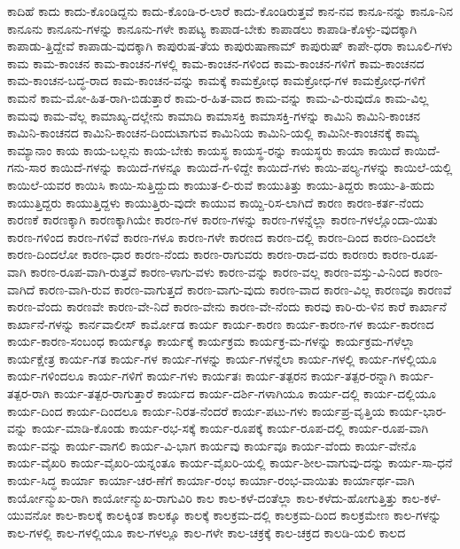 {ಕಾದಿಹೆ
ಕಾದು
ಕಾದು-ಕೊಂಡಿದ್ದನು
ಕಾದು-ಕೊಂಡಿ-ರ-ಲಾರೆ
ಕಾದು-ಕೊಂಡಿರುತ್ತವೆ
ಕಾನ-ನವ
ಕಾನೂ-ನನ್ನು
ಕಾನೂ-ನಿನ
ಕಾನೂನು
ಕಾನೂನು-ಗಳನ್ನು
ಕಾನೂನು-ಗಳೇ
ಕಾಪಟ್ಯ
ಕಾಪಾಡ-ಬೇಕು
ಕಾಪಾಡಲು
ಕಾಪಾಡಿ-ಕೊಳ್ಳು-ವುದಕ್ಕಾಗಿ
ಕಾಪಾಡು-ತ್ತಿದ್ದೇವೆ
ಕಾಪಾಡು-ವುದಕ್ಕಾಗಿ
ಕಾಪುರುಷ-ತೆಯ
ಕಾಪುರುಷಾಣಾಮ್
ಕಾಪುರುಷ್
ಕಾಪೇ-ಧರಾ
ಕಾಬೂಲಿ-ಗಳು
ಕಾಮ
ಕಾಮ-ಕಾಂಚನ
ಕಾಮ-ಕಾಂಚನ-ಗಳಲ್ಲಿ
ಕಾಮ-ಕಾಂಚನ-ಗಳಿಂದ
ಕಾಮ-ಕಾಂಚನ-ಗಳಿಗೆ
ಕಾಮ-ಕಾಂಚನದ
ಕಾಮ-ಕಾಂಚನ-ಬದ್ಧ-ರಾದ
ಕಾಮ-ಕಾಂಚನ-ವನ್ನು
ಕಾಮಕ್ಕೆ
ಕಾಮಕ್ರೋಧ
ಕಾಮಕ್ರೋಧ-ಗಳ
ಕಾಮಕ್ರೋಧ-ಗಳಿಗೆ
ಕಾಮನೆ
ಕಾಮ-ಮೋ-ಹಿತ-ರಾಗಿ-ಬಿಡುತ್ತಾರೆ
ಕಾಮ-ರ-ಹಿತ-ವಾದ
ಕಾಮ-ವನ್ನು
ಕಾಮ-ವಿ-ರುವುದೊ
ಕಾಮ-ವಿಲ್ಲ
ಕಾಮವು
ಕಾಮ-ವೆಲ್ಲ
ಕಾಮಾಖ್ಯ-ದಲ್ಲೇನು
ಕಾಮಾದಿ
ಕಾಮಾಸಕ್ತಿ
ಕಾಮಾಸಕ್ತಿ-ಗಳನ್ನು
ಕಾಮಿನಿ
ಕಾಮಿನಿ-ಕಾಂಚನ
ಕಾಮಿನಿ-ಕಾಂಚನದ
ಕಾಮಿನಿ-ಕಾಂಚನ-ದಿಂದುಟಾಗುವ
ಕಾಮಿನಿಯ
ಕಾಮಿನಿ-ಯಲ್ಲಿ
ಕಾಮಿನೀ-ಕಾಂಚನಕ್ಕೆ
ಕಾಮ್ಯ
ಕಾಮ್ಯಾನಾಂ
ಕಾಯ
ಕಾಯ-ಬಲ್ಲನು
ಕಾಯ-ಬೇಕು
ಕಾಯಸ್ಥ
ಕಾಯಸ್ಥ-ರನ್ನು
ಕಾಯಸ್ಥರು
ಕಾಯಾ
ಕಾಯಿದೆ
ಕಾಯಿದೆ-ಗನು-ಸಾರ
ಕಾಯಿದೆ-ಗಳನ್ನು
ಕಾಯಿದೆ-ಗಳನ್ನೂ
ಕಾಯಿದೆ-ಗ-ಳಿದ್ದೇ
ಕಾಯಿದೆ-ಗಳು
ಕಾಯಿ-ಪಲ್ಯ-ಗಳನ್ನು
ಕಾಯಿಲೆ-ಯಲ್ಲಿ
ಕಾಯಿಲೆ-ಯವರ
ಕಾಯಿಸಿ
ಕಾಯಿ-ಸುತ್ತಿದ್ದುದು
ಕಾಯುತ-ಲಿ-ರುವೆ
ಕಾಯುತಿತ್ತು
ಕಾಯು-ತಿದ್ದರು
ಕಾಯು-ತಿ-ಹುದು
ಕಾಯುತ್ತಿದ್ದರು
ಕಾಯುತ್ತಿದ್ದಳು
ಕಾಯುತ್ತಿರು-ವುದೇ
ಕಾಯುವ
ಕಾಯ್ದಿ-ರಿಸ-ಲಾಗಿದೆ
ಕಾರಣ
ಕಾರಣ-ಕರ್ತ-ನೆಂದು
ಕಾರಣಕೆ
ಕಾರಣಕ್ಕಾಗಿ
ಕಾರಣಕ್ಕಾಗಿಯೇ
ಕಾರಣ-ಗಳ
ಕಾರಣ-ಗಳನ್ನು
ಕಾರಣ-ಗಳನ್ನೆಲ್ಲಾ
ಕಾರಣ-ಗಳಲ್ಲೊಂದಾ-ಯಿತು
ಕಾರಣ-ಗಳಿಂದ
ಕಾರಣ-ಗಳಿವೆ
ಕಾರಣ-ಗಳೂ
ಕಾರಣ-ಗಳೇ
ಕಾರಣದ
ಕಾರಣ-ದಲ್ಲಿ
ಕಾರಣ-ದಿಂದ
ಕಾರಣ-ದಿಂದಲೇ
ಕಾರಣ-ದಿಂದಲೋ
ಕಾರಣ-ಧಾರ
ಕಾರಣ-ನೆಂದು
ಕಾರಣ-ರಾಗುವರು
ಕಾರಣ-ರಾದ-ವರು
ಕಾರಣರು
ಕಾರಣ-ರೂಪ-ವಾಗಿ
ಕಾರಣ-ರೂಪ-ವಾಗಿ-ರುತ್ತವೆ
ಕಾರಣ-ಳಾಗು-ವಳು
ಕಾರಣ-ವನ್ನು
ಕಾರಣ-ವಲ್ಲ
ಕಾರಣ-ವಸ್ತು-ವಿ-ನಿಂದ
ಕಾರಣ-ವಾಗಿದೆ
ಕಾರಣ-ವಾಗಿ-ರುವ
ಕಾರಣ-ವಾಗುತ್ತದೆ
ಕಾರಣ-ವಾಗು-ವುದು
ಕಾರಣ-ವಾದ
ಕಾರಣ-ವಿಲ್ಲ
ಕಾರಣವೂ
ಕಾರಣವೆ
ಕಾರಣ-ವೆಂದು
ಕಾರಣವೇ
ಕಾರಣ-ವೇ-ನಿದೆ
ಕಾರಣ-ವೇನು
ಕಾರಣ-ವೇ-ನೆಂದು
ಕಾರವು
ಕಾರಿ-ರು-ಳಿನ
ಕಾರೆ
ಕಾರ್ಖಾನೆ
ಕಾರ್ಖಾನೆ-ಗಳನ್ನು
ಕಾರ್ನವಾಲೀಸ್
ಕಾರ್ಮೋಡ
ಕಾರ್ಯ
ಕಾರ್ಯ-ಕಾರಣ
ಕಾರ್ಯ-ಕಾರಣ-ಗಳ
ಕಾರ್ಯ-ಕಾರಣದ
ಕಾರ್ಯ-ಕಾರಣ-ಸಂಬಂಧ
ಕಾರ್ಯಕ್ಕೂ
ಕಾರ್ಯಕ್ಕೆ
ಕಾರ್ಯಕ್ರಮ
ಕಾರ್ಯಕ್ರ-ಮ-ಗಳನ್ನು
ಕಾರ್ಯಕ್ರಮ-ಗಳೆಲ್ಲಾ
ಕಾರ್ಯಕ್ಷೇತ್ರ
ಕಾರ್ಯ-ಗತ
ಕಾರ್ಯ-ಗಳ
ಕಾರ್ಯ-ಗಳನ್ನು
ಕಾರ್ಯ-ಗಳನ್ನೆಲಾ
ಕಾರ್ಯ-ಗಳಲ್ಲಿ
ಕಾರ್ಯ-ಗಳಲ್ಲಿಯೂ
ಕಾರ್ಯ-ಗಳಿಂದಲೂ
ಕಾರ್ಯ-ಗಳಿಗೆ
ಕಾರ್ಯ-ಗಳು
ಕಾರ್ಯತಃ
ಕಾರ್ಯ-ತತ್ಪರನ
ಕಾರ್ಯ-ತತ್ಪರ-ರನ್ನಾಗಿ
ಕಾರ್ಯ-ತತ್ಪರ-ರಾಗಿ
ಕಾರ್ಯ-ತತ್ಪರ-ರಾಗುತ್ತಾರೆ
ಕಾರ್ಯದ
ಕಾರ್ಯ-ದರ್ಶಿ-ಗಳಾಗಿಯೂ
ಕಾರ್ಯ-ದಲ್ಲಿ
ಕಾರ್ಯ-ದಲ್ಲಿಯೂ
ಕಾರ್ಯ-ದಿಂದ
ಕಾರ್ಯ-ದಿಂದಲೂ
ಕಾರ್ಯ-ನಿರತ-ನೆಂದರೆ
ಕಾರ್ಯ-ಪಟು-ಗಳು
ಕಾರ್ಯಪ್ರ-ವೃತ್ತಿಯ
ಕಾರ್ಯ-ಭಾರ-ವನ್ನು
ಕಾರ್ಯ-ಮಾಡಿ-ಕೊಂಡು
ಕಾರ್ಯ-ರಭ-ಸಕ್ಕೆ
ಕಾರ್ಯ-ರೂಪಕ್ಕೆ
ಕಾರ್ಯ-ರೂಪ-ದಲ್ಲಿ
ಕಾರ್ಯ-ರೂಪ-ವಾಗಿ
ಕಾರ್ಯ-ವನ್ನು
ಕಾರ್ಯ-ವಾಗಲಿ
ಕಾರ್ಯ-ವಿ-ಭಾಗ
ಕಾರ್ಯವು
ಕಾರ್ಯವೂ
ಕಾರ್ಯ-ವೆಂದು
ಕಾರ್ಯ-ವೇನೊ
ಕಾರ್ಯ-ವೈಖರಿ
ಕಾರ್ಯ-ವೈಖರಿ-ಯನ್ನಂತೂ
ಕಾರ್ಯ-ವೈಖರಿ-ಯಲ್ಲಿ
ಕಾರ್ಯ-ಶೀಲ-ವಾಗುವು-ದನ್ನು
ಕಾರ್ಯ-ಸಾ-ಧನೆ
ಕಾರ್ಯ-ಸಿದ್ಧ
ಕಾರ್ಯಾ
ಕಾರ್ಯಾ-ಚರ-ಣೆಗೆ
ಕಾರ್ಯಾ-ರಂಭ
ಕಾರ್ಯಾ-ರಂಭ-ವಾಯಿತು
ಕಾರ್ಯಾರ್ಥ-ವಾಗಿ
ಕಾರ್ಯೋನ್ಮುಖ-ರಾಗಿ
ಕಾರ್ಯೋನ್ಮುಖ-ರಾಗುವಿರಿ
ಕಾಲ
ಕಾಲ-ಕಳೆ-ದಂತೆಲ್ಲಾ
ಕಾಲ-ಕಳೆದು-ಹೋಗುತ್ತಿತ್ತು
ಕಾಲ-ಕಳೆ-ಯುವನೋ
ಕಾಲ-ಕಾಲಕ್ಕೆ
ಕಾಲಕ್ಕಿಂತ
ಕಾಲಕ್ಕೂ
ಕಾಲಕ್ಕೆ
ಕಾಲಕ್ರಮ-ದಲ್ಲಿ
ಕಾಲಕ್ರಮ-ದಿಂದ
ಕಾಲಕ್ರಮೇಣ
ಕಾಲ-ಗಳನ್ನು
ಕಾಲ-ಗಳಲ್ಲಿ
ಕಾಲ-ಗಳಲ್ಲಿಯೂ
ಕಾಲ-ಗಳಲ್ಲೂ
ಕಾಲ-ಗಳೇ
ಕಾಲ-ಚಕ್ರಕ್ಕೆ
ಕಾಲ-ಚಕ್ರದ
ಕಾಲಡಿ-ಯಲಿ
ಕಾಲದ
}
